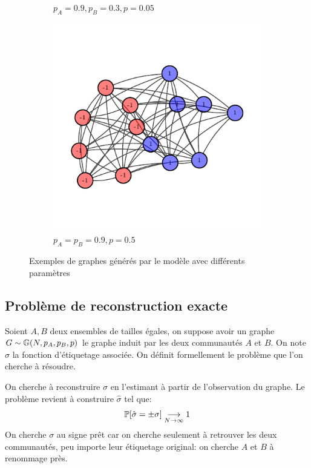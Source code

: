 \documentclass{standalone}
\begin{document}
\begin{figure}[H]
\begin{subfigure}{0.3\textwidth}
			\caption{$p_A = 0.9, p_B = 0.3, p=0.05$}
		\end{subfigure}
		\begin{subfigure}{0.3\textwidth}
			\includegraphics[scale=0.5]{ig-plots/tmp/large_largenoise.pdf}
			\caption{$p_A = p_B = 0.9, p=0.5$}
		\end{subfigure}
		
		
		
		\caption{Exemples de graphes générés par le modèle avec différents paramètres}
	\end{figure}

\subsection{Problème de reconstruction exacte}
	Soient $A,B$ deux ensembles de tailles égales, on suppose avoir un graphe $G \sim \mathbb G(N, p_A, p_B, p)$ le graphe induit par les deux communautés $A$ et $B$. On note $\sigma$ la fonction d'étiquetage associée. On définit formellement le problème que l'on cherche à résoudre.
	
	\begin{defn}
		On cherche à reconstruire $\sigma$ en l'estimant à partir de l'observation du graphe. Le problème revient à construire $\hat{\sigma}$ tel que:
		\[ \mathbb P[\hat{\sigma} = \pm \sigma] \underset{N \rightarrow \infty}{\longrightarrow} 1
		\]
		On cherche $\sigma$ au signe prêt car on cherche seulement à retrouver les deux communautés, peu importe leur étiquetage original: on cherche $A$ et $B$ à renommage près.
	\end{defn}
\end{document}
